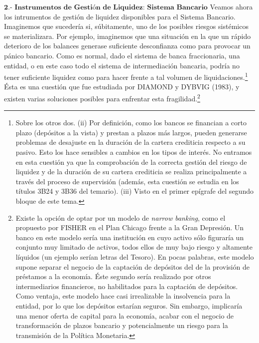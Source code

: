 \documentclass[10pt,a4paper]{article}
\begin{document}
$\textbf{2.- Instrumentos de Gestión de Liquidez: Sistema Bancario}$
Veamos ahora los intrumentos de gestión de liquidez disponibles para el Sistema Bancario. Imaginemos que sucedería si, súbitamente, uno de los posibles riesgos sistémicos se materializara. Por ejemplo, imaginemos que una situación en la que un rápido deterioro de los balances generase suficiente desconfianza como para provocar un pánico bancario. Como es normal, dado el sistema de banca fraccionaria, una entidad, o en este caso todo el sistema de intermediación bancaria, podría no tener suficiente liquidez como para hacer frente a tal volumen de liquidaciones.\footnote{%
    Sobre los otros dos. (ii) Por definición, como los bancos se financian a corto plazo (depósitos a la vista) y prestan a plazos más largos, pueden generarse problemas de desajuste en la duración de la cartera crediticia respecto a su pasivo. Esto los hace sensibles a cambios en los tipos de interés. No entramos en esta cuestión ya que la comprobación de la correcta gestión del riesgo de liquidez y de la duración de su cartera crediticia se realiza principalmente a través del proceso de supervisión (además, esta cuestión se estudia en los títulos 3B24 y 3B36 del temario). (iii) Visto en el primer epígrafe del segundo bloque de este tema.
} Ésta es una cuestión que fue estudiada por DIAMOND y DYBVIG (1983), y existen varias soluciones posibles para enfrentar esta fragilidad.\footnote{%
    Existe la opción de optar por un modelo de \textit{narrow banking}, como el propuesto por FISHER en el Plan Chicago frente a la Gran Depresión. Un banco en este modelo sería una institución en cuyo activo sólo figuraría un conjunto muy limitado de activos, todos ellos de muy bajo riesgo y altamente líquidos (un ejemplo serían letras del Tesoro). En pocas palabras, este modelo supone separar el negocio de la captación de depósitos del de la provisión de préstamos a la economía. Éste segundo sería realizado por otros intermediarios financieros, no habilitados para la captación de depósitos. Como ventaja, este modelo hace casi irrealizable la insolvencia para la entidad, por lo que los depósitos estarían seguros. Sin embargo, implicaría una menor oferta de capital para la economía, acabar con el negocio de transformación de plazos bancario y potencialmente un riesgo para la transmisión de la Política Monetaria.
} 
\end{document}
